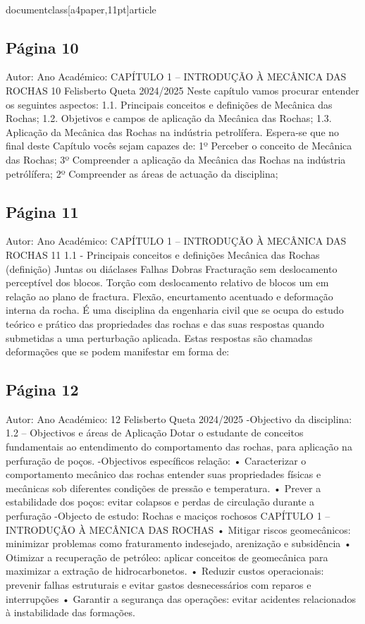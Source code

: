 \\documentclass[a4paper,11pt]{article}
\begin{document}
\subsection*{Página 10}
Autor:
Ano Académico:
CAPÍTULO 1 – INTRODUÇÃO À MECÂNICA DAS ROCHAS
10
Felisberto Queta
2024/2025
Neste capítulo vamos procurar entender os seguintes aspectos:
1.1. Principais conceitos e definições de Mecânica das Rochas;
1.2. Objetivos e campos de aplicação da Mecânica das Rochas;
1.3. Aplicação da Mecânica das Rochas na indústria petrolífera.
Espera-se que no final deste Capítulo vocês sejam capazes de:
1º Perceber o conceito de Mecânica das Rochas; 
3º Compreender a aplicação da Mecânica das Rochas na indústria petrólífera;
2º Compreender as áreas de actuação da disciplina;



\subsection*{Página 11}
Autor:
Ano Académico:
CAPÍTULO 1 – INTRODUÇÃO À MECÂNICA DAS ROCHAS
11
1.1 - Principais conceitos e definições 
Mecânica das Rochas (definição)
Juntas ou diáclases
Falhas
Dobras
Fracturação sem 
deslocamento perceptível dos 
blocos.
Torção com deslocamento 
relativo de blocos um em 
relação ao plano de fractura.
Flexão,  encurtamento
acentuado e deformação
interna da rocha.
É uma disciplina da engenharia civil que se ocupa do estudo teórico e prático das propriedades das
rochas e das suas respostas quando submetidas a uma perturbação aplicada. Estas respostas são
chamadas deformações que se podem manifestar em forma de:



\subsection*{Página 12}
Autor:
Ano Académico:
12
Felisberto Queta
2024/2025
-Objectivo da disciplina:
1.2 – Objectivos e áreas de Aplicação
Dotar o estudante de conceitos fundamentais ao entendimento do comportamento das rochas, para aplicação na perfuração
de poços.
-Objectivos específicos relação:
•
Caracterizar
o
comportamento
mecânico das rochas
entender suas propriedades físicas e mecânicas sob diferentes condições de
pressão e temperatura.
• Prever a estabilidade dos poços:
evitar colapsos e perdas de circulação durante a perfuração
-Objecto de estudo:
Rochas e maciços rochosos
CAPÍTULO 1 – INTRODUÇÃO À MECÂNICA DAS ROCHAS
• Mitigar riscos geomecânicos:
minimizar problemas como fraturamento indesejado, arenização e subsidência
• Otimizar a recuperação de petróleo:
aplicar
conceitos
de
geomecânica
para
maximizar
a
extração
de
hidrocarbonetos.
• Reduzir custos operacionais:
prevenir falhas estruturais e evitar gastos desnecessários com reparos e
interrupções
• Garantir a segurança das operações:
evitar acidentes relacionados à instabilidade das formações.
\end{document}
